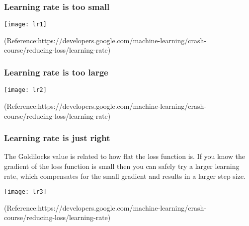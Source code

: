 \begin{frame}[fragile]\frametitle{Learning rate is too small}
\begin{center}
\texttt{[image: lr1]}
\end{center}


\tiny{(Reference:https://developers.google.com/machine-learning/crash-course/reducing-loss/learning-rate)}
\end{frame}

\begin{frame}[fragile]\frametitle{Learning rate is too large}
\begin{center}
\texttt{[image: lr2]}
\end{center}


\tiny{(Reference:https://developers.google.com/machine-learning/crash-course/reducing-loss/learning-rate)}
\end{frame}

\begin{frame}[fragile]\frametitle{ Learning rate is just right}

The Goldilocks value is related to how flat the loss function is. If you know the gradient of the loss function is small then you can safely try a larger learning rate, which compensates for the small gradient and results in a larger step size.


\begin{center}
\texttt{[image: lr3]}
\end{center}


\tiny{(Reference:https://developers.google.com/machine-learning/crash-course/reducing-loss/learning-rate)}
\end{frame}


